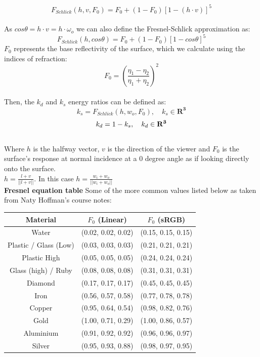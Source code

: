 \documentclass{article}
\begin{document}
$$F_{Schlick} \left( h, v, F_{0}\right) = F_{0} + \left(1 - F_{0} \right)\left[ 1 - \left( h \cdot v\right)\right]^{5}$$
\\
As $cos\theta= h \cdot v = h \cdot \omega_{o}$ we can also define the Fresnel-Schlick approximation as:
$$F_{Schlick} \left( h, cos\theta \right) = F_{0} + \left(1 - F_{0} \right)\left[ 1 - cos\theta\right]^{5}$$
$F_{0}$ represents the base reflectivity of the surface, which we calculate using the indices of refraction:
\\
$$F_{0}=\left( \frac{\eta_{1} - \eta_{2}}{\eta_{1} + \eta_{2}} \right)^{2}$$
\\
Then, the $k_{d}$ and $k_{s}$ energy ratios can be defined as:\newline
\\
$$k_{s} = F_{Schlick}(h, w_{o}, F_{0}), \quad k_{s} \in \mathbf{R^3}$$
$$k_{d} = 1 - k_{s}, \quad k_{d} \in \mathbf{R^3}\newline$$
\\
Where $h$ is the halfway vector, $v$ is the direction of the viewer and $F_{0}$ is the surface's response at normal incidence at a 0 degree angle as if looking directly onto the surface.\newline
\\
$h = \frac{l + v}{||l + v||}$. In this case $h = \frac{w_{i} + w_{o}}{||w_{i} + w_{o}||}$\newline
\\
\textbf{Fresnel equation table}\newline
Some of the more common values listed below as taken from Naty Hoffman's course notes:\newline
\begin{center}
\begin{tabular}{ |c | c | c |}
\hline
 \textbf{Material} & \textbf{$F_{0}$ (Linear)} & \textbf{$F_{0}$ (sRGB)} \\ 
 \hline
 Water & (0.02, 0.02, 0.02) & (0.15, 0.15, 0.15) \\  
 Plastic / Glass (Low) & (0.03, 0.03, 0.03) & (0.21, 0.21, 0.21) \\      
 Plastic High & 	(0.05, 0.05, 0.05) & (0.24, 0.24, 0.24) \\  
 Glass (high) / Ruby & (0.08, 0.08, 0.08) & (0.31, 0.31, 0.31) \\  
 Diamond & 	(0.17, 0.17, 0.17) & (0.45, 0.45, 0.45) \\  
 Iron & (0.56, 0.57, 0.58) & (0.77, 0.78, 0.78) \\  
 Copper & (0.95, 0.64, 0.54)	& (0.98, 0.82, 0.76) \\  
 Gold & 	(1.00, 0.71, 0.29) & (1.00, 0.86, 0.57) \\  
 Aluminium & (0.91, 0.92, 0.92) & (0.96, 0.96, 0.97) \\  
 Silver & (0.95, 0.93, 0.88)	 & (0.98, 0.97, 0.95) \\  
 \hline
\end{tabular}
\end{center}
\end{document}
